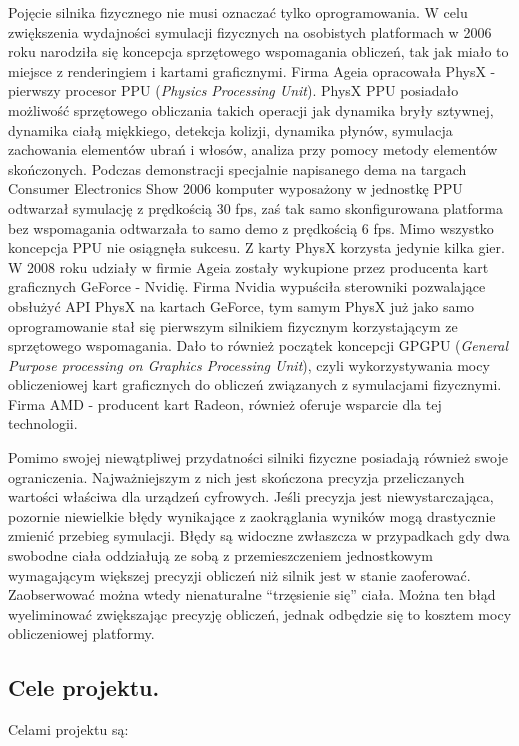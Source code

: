 Pojęcie silnika fizycznego nie musi oznaczać tylko oprogramowania. W celu
zwiększenia wydajności symulacji fizycznych na osobistych platformach w 2006
roku narodziła się koncepcja sprzętowego wspomagania obliczeń, tak jak miało to
miejsce z renderingiem i kartami graficznymi. Firma Ageia opracowała PhysX -
pierwszy procesor PPU (\emph{Physics Processing Unit}). PhysX PPU posiadało
możliwość sprzętowego obliczania takich operacji jak dynamika bryły sztywnej, dynamika
ciałą miękkiego, detekcja kolizji, dynamika płynów, symulacja zachowania
elementów ubrań i włosów, analiza przy pomocy metody elementów skończonych.
Podczas demonstracji specjalnie napisanego dema na targach Consumer Electronics
Show 2006 komputer wyposażony w jednostkę PPU odtwarzał symulację z prędkością
30 fps, zaś tak samo skonfigurowana platforma bez wspomagania odtwarzała to samo
demo z prędkością 6 fps. Mimo wszystko koncepcja PPU nie osiągnęła sukcesu. Z
karty PhysX korzysta jedynie kilka gier. W 2008 roku udziały w firmie Ageia
zostały wykupione przez producenta kart graficznych GeForce - Nvidię. Firma
Nvidia wypuściła sterowniki pozwalające obsłużyć API PhysX na kartach GeForce,
tym samym PhysX już jako samo oprogramowanie stał się pierwszym silnikiem
fizycznym korzystającym ze sprzętowego wspomagania. Dało to również początek
koncepcji GPGPU (\emph{General Purpose processing on Graphics Processing Unit}),
czyli wykorzystywania mocy obliczeniowej kart graficznych do obliczeń związanych
z symulacjami fizycznymi. Firma AMD - producent kart Radeon, również oferuje
wsparcie dla tej technologii.

Pomimo swojej niewątpliwej przydatności silniki fizyczne posiadają również swoje
ograniczenia. Najważniejszym z nich jest skończona precyzja przeliczanych
wartości właściwa dla urządzeń cyfrowych. Jeśli precyzja jest niewystarczająca,
pozornie niewielkie błędy wynikające z zaokrąglania wyników mogą drastycznie
zmienić przebieg symulacji. Błędy są widoczne zwłaszcza w przypadkach gdy dwa
swobodne ciała oddziałują ze sobą z przemieszczeniem jednostkowym wymagającym
większej precyzji obliczeń niż silnik jest w stanie zaoferować. Zaobserwować
można wtedy nienaturalne ``trzęsienie się'' ciała. Można ten błąd wyeliminować
zwiększając precyzję obliczeń, jednak odbędzie się to kosztem mocy obliczeniowej
platformy.

\subsection{Cele projektu.}\label{subsec:celeProjektu}
Celami projektu są:\\

